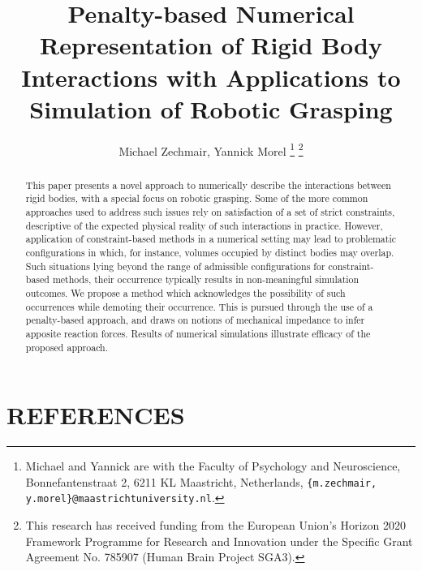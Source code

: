 \documentclass[letterpaper, 10pt, conference]{ieeeconf}
\title{\LARGE \bf Penalty-based Numerical Representation of Rigid Body Interactions with Applications to Simulation of Robotic Grasping}
\author{Michael Zechmair, Yannick Morel%
	\thanks{Michael and Yannick are with the Faculty of Psychology and Neuroscience,
		Bonnefantenstraat 2, 6211 KL Maastricht, Netherlands,
		{\tt\scriptsize \{m.zechmair, y.morel\}@maastrichtuniversity.nl}.}%
	\thanks{This research has received funding from the European Union's Horizon 2020 Framework Programme for Research and Innovation under the Specific Grant Agreement No. 785907 (Human Brain Project SGA3).}%
}
\begin{document}
	\maketitle
	\thispagestyle{empty}
	\pagestyle{empty}
	
	\noindent\begin{abstract}
		This paper presents a novel approach to numerically describe the interactions between rigid bodies, with a special focus on robotic grasping. Some of the more common approaches used to address such issues rely on satisfaction of a set of strict constraints, descriptive of the expected physical reality of such interactions in practice. However, application of constraint-based methods in a numerical setting may lead to problematic configurations in which, for instance, volumes occupied by distinct bodies may overlap. Such situations lying beyond the range of admissible configurations for constraint-based methods, their occurrence typically results in non-meaningful simulation outcomes. We propose a method which acknowledges the possibility of such occurrences while demoting their occurrence. This is pursued through the use of a penalty-based approach, and draws on notions of mechanical impedance to infer apposite reaction forces. Results of numerical simulations illustrate efficacy of the proposed approach.
	\end{abstract}
	
	
	
	
	
	
	
	
	\section{REFERENCES}
	
	\begingroup
	\renewcommand{\section}[2]{}%
	
	\endgroup
	
\end{document}
